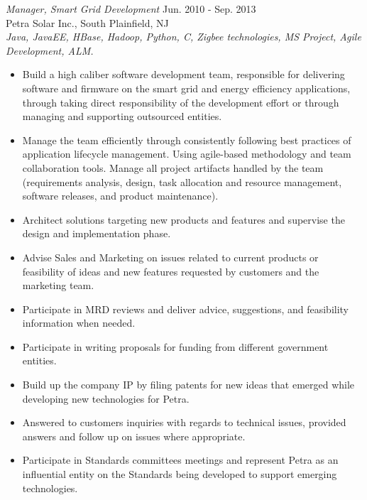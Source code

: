 \documentclass[line,margin]{res}
\begin{document}
\begin{resume}
{\sl Manager, Smart Grid Development} \hfill        Jun. 2010 - Sep. 2013  \\
Petra Solar Inc., South Plainfield, NJ \\
  \textit{Java, JavaEE, HBase, Hadoop, Python, C, Zigbee technologies, MS
  Project, Agile Development, ALM.}
  \begin{itemize} \itemsep -2pt %
      \item  Build a high caliber software development team, responsible for
      delivering software and firmware on the
      smart grid and energy efficiency applications, through taking direct
      responsibility of the development effort or through managing and
      supporting outsourced entities.
      \item  Manage the team efficiently through consistently following best
      practices of application lifecycle management.  Using agile-based
      methodology and team collaboration tools. Manage all project artifacts
      handled by the team (requirements analysis, design, task allocation and
      resource management, software releases, and product maintenance).
      \item  Architect solutions targeting new products and features and
      supervise the design and implementation phase.
      \item  Advise Sales and Marketing on issues related to current products
      or feasibility of ideas and new features requested by customers and
      the marketing team.
      \item  Participate in MRD reviews and deliver advice, suggestions, and
      feasibility information when needed.
      \item  Participate in writing proposals for funding from different
      government entities.
      \item  Build up the company IP by filing patents for new ideas that
      emerged while developing new technologies for Petra.
      \item  Answered to customers inquiries with regards to technical issues,
      provided answers and follow up on issues where appropriate.
      \item  Participate in Standards committees meetings and represent Petra as
      an influential entity on the Standards being developed to support emerging
      technologies.
 \end{itemize}


\end{resume}
\end{document}
